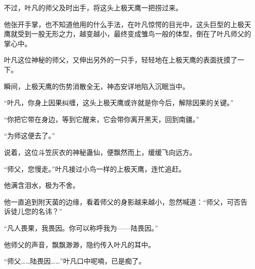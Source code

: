\begin{this_body}
不过，叶凡的师父及时出手，将这头上极天鹰一把捞过来。

他张开手掌，也不知道他用的什么手法，在叶凡惊愕的目光中，这头巨型的上极天鹰就受到一股无形之力，越变越小，最终变成雏鸟一般的体型，倒在了叶凡师父的掌心中。

叶凡这位神秘的师父，又伸出另外的一只手，轻轻地在上极天鹰的表面抚摸了一下。

瞬间，上极天鹰的伤势消散全无，神态安详地陷入沉眠当中。

“叶凡，你身上因果纠缠，这头上极天鹰或许就是你今后，解除因果的关键。”

“你把它带在身边，等到它醒来，它会带你离开黑天，回到南疆。”

“为师这便去了。”

说着，这位斗笠灰衣的神秘蛊仙，便飘然而上，缓缓飞向远方。

“师父，您慢走。”叶凡接过小鸟一样的上极天鹰，连忙追赶。

他满含泪水，极为不舍。

他一直追到附天菌的边缘，看着师父的身影越来越小，忽然喊道：“师父，可否告诉徒儿您的名讳？”

“凡人畏果，我畏因。你可以称呼我为——陆畏因。”

他师父的声音，飘飘渺渺，隐约传入叶凡的耳中。

“师父……陆畏因……”叶凡口中呢喃，已是痴了。

\end{this_body}

